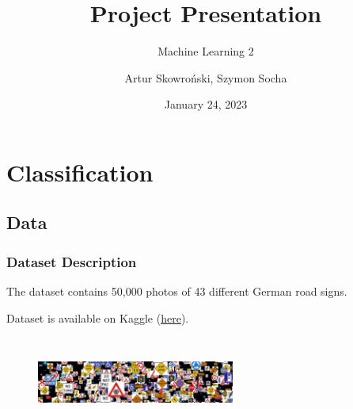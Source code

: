 \documentclass[8pt]{beamer}
\title[Machine-Learining-2\_Project-Presentation\_AS-SS] %
{Project Presentation}
\subtitle{Machine Learning 2}
\author[Artur Skowroński, Szymon Socha] %
{Artur Skowroński, Szymon Socha}
\date[January 24, 2023] %
{January 24, 2023}
\begin{document}
\frame{\titlepage}




\section{Classification}

\subsection{Data}
\begin{frame}
\frametitle{Dataset Description}
The dataset contains 50,000 photos of 43 different German road signs.

Dataset is available on Kaggle (\href{https://www.kaggle.com/datasets/meowmeowmeowmeowmeow/gtsrb-german-traffic-sign}{\underline{here}}).
\begin{figure}[t]
\includegraphics[width=6.5cm, height=3cm]{road-signs.jpg}
\centering
\end{figure}

\end{frame}
\end{document}

